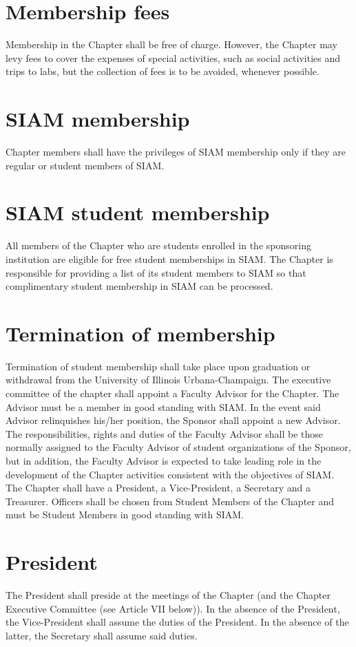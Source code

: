 \documentclass{ronr-bylaws}
\begin{document}
\section{Membership fees}
Membership in the Chapter shall be free of charge. However, the Chapter may levy
fees to cover the expenses of special activities, such as social activities and trips to labs, but the
collection of fees is to be avoided, whenever possible.

\section{SIAM membership}
Chapter members shall have the privileges of SIAM membership only if they are regular
or student members of SIAM.

\section{SIAM student membership}
All members of the Chapter who are students enrolled in the sponsoring institution are
eligible for free student memberships in SIAM. The Chapter is responsible for providing a list of its
student members to SIAM so that complimentary student membership in SIAM can be processed.

\section{Termination of membership}
Termination of student membership shall take place upon graduation or withdrawal
from the University of Illinois Urbana-Champaign.
%
The executive committee of the chapter shall appoint a Faculty Advisor for the Chapter.  The Advisor must be a member in good standing with SIAM. In the event said Advisor relinquishes his/her position, the Sponsor shall appoint a new Advisor.  The responsibilities, rights and duties of the Faculty Advisor shall be those normally assigned to the Faculty Advisor of student organizations of the Sponsor, but in addition, the Faculty Advisor is expected to take leading role in the development of the Chapter activities consistent with the objectives of SIAM.
%
The Chapter shall have a President, a Vice-President, a Secretary and a Treasurer. Officers shall be chosen from Student Members of the Chapter and must  be Student Members in good standing with SIAM.

\section{President}
The President shall preside at the meetings of the Chapter (and the Chapter Executive Committee (see Article VII below)).  In the absence of the President, the Vice-President shall assume the duties of the President.  In the absence of the latter, the Secretary shall assume said duties.
\end{document}
